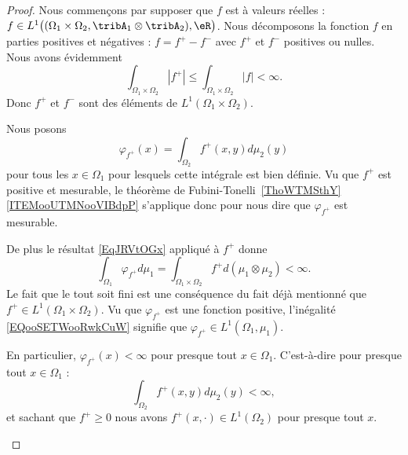 \begin{proof}
	Nous commençons par supposer que \( f\) est à valeurs réelles : \( f\in L^1\big( (\Omega_1\times \Omega_2,\tribA_1\otimes\tribA_2 ),\eR\big)\). Nous décomposons la fonction \( f\) en parties positives et négatives : \( f=f^+-f^-\) avec \( f^+\) et \( f^-\) positives ou nulles. Nous avons évidemment
	\begin{equation}
		\int_{\Omega_1\times \Omega_2}| f^+ |\leq \int_{\Omega_1\times \Omega_2}| f |<\infty.
	\end{equation}
	Donc \( f^+\) et \( f^-\) sont des éléments de \( L^1(\Omega_1\times \Omega_2)\).

	\begin{subproof}

		Nous posons
		\begin{equation}
			\varphi_{f^+}(x)=\int_{\Omega_2}f^{+}(x,y)d\mu_2(y)
		\end{equation}
		pour tous les \( x\in \Omega_1\) pour lesquels cette intégrale est bien définie. Vu que \( f^+\) est positive et mesurable, le théorème de Fubini-Tonelli~\ref{ThoWTMSthY}\ref{ITEMooUTMNooVIBdpP} s'applique donc pour nous dire que \( \varphi_{f^+}\) est mesurable.

		De plus le résultat \eqref{EqJRVtOGx} appliqué à \( f^+\) donne
		\begin{equation}        \label{EQooSETWooRwkCuW}
			\int_{\Omega_1}\varphi_{f^+}d\mu_1=\int_{\Omega_1\times \Omega_2}f^+d(\mu_1\otimes \mu_2)<\infty.
		\end{equation}
		Le fait que le tout soit fini est une conséquence du fait déjà mentionné que \( f^+\in L^1(\Omega_1\times \Omega_2)\). Vu que \( \varphi_{f^+}\) est une fonction positive, l'inégalité \eqref{EQooSETWooRwkCuW} signifie que \( \varphi_{f^+}\in L^1(\Omega_1,\mu_1)\).

		En particulier, \( \varphi_{f^+}(x)<\infty\) pour presque tout \( x\in\Omega_1\). C'est-à-dire pour presque tout \( x\in \Omega_1\) :
		\begin{equation}
			\int_{\Omega_2}f^+(x,y)d\mu_2(y)<\infty,
		\end{equation}
		et sachant que \( f^+\geq 0\) nous avons \( f^+(x,\cdot)\in L^1(\Omega_2)\) pour presque tout \( x\).



\end{subproof}
\end{proof}
